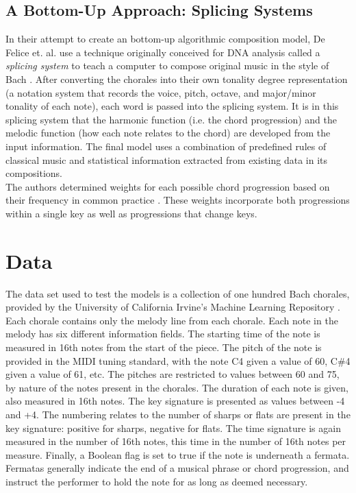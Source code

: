 \documentclass[12pt]{article}
\begin{document}
\subsection{A Bottom-Up Approach: Splicing Systems}
In their attempt to create an bottom-up algorithmic composition model, De Felice et. al. use a technique originally conceived for DNA analysis called a {\it splicing system} to teach a computer to compose original music in the style of Bach \cite{computer_composer}. After converting the chorales into their own tonality degree representation (a notation system that records the voice, pitch, octave, and major/minor tonality of each note), each word is passed into the splicing system. It is in this splicing system that the harmonic function (i.e. the chord progression) and the melodic function (how each note relates to the chord) are developed from the input information. The final model uses a combination of predefined rules of classical music and statistical information extracted from existing data in its compositions.\\

The authors determined weights for each possible chord progression based on their frequency in common practice \cite{computer_composer}. These weights incorporate both progressions within a single key as well as progressions that change keys. 

\section{Data}
The data set used to test the models is a collection of one hundred Bach chorales, provided by the University of California Irvine's Machine Learning Repository \cite{data_set}. Each chorale contains only the melody line from each chorale. Each note in the melody has six different information fields. The starting time of the note is measured in 16th notes from the start of the piece. The pitch of the note is provided in the MIDI tuning standard, with the note C4 given a value of 60, C\#4 given a value of 61, etc. The pitches are restricted to values between 60 and 75, by nature of the notes present in the chorales. The duration of each note is given, also measured in 16th notes. The key signature is presented as values between -4 and +4. The numbering relates to the number of sharps or flats are present in the key signature: positive for sharps, negative for flats. The time signature is again measured in the number of 16th notes, this time in the number of 16th notes per measure. Finally, a Boolean flag is set to true if the note is underneath a fermata. Fermatas generally indicate the end of a musical phrase or chord progression, and instruct the performer to hold the note for as long as deemed necessary.
\end{document}
